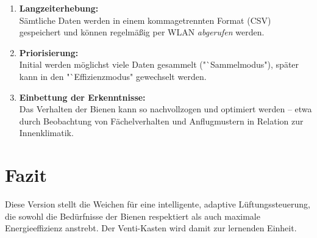 \documentclass[11pt,a4paper]{article}
\begin{document}
\begin{enumerate}[label=\arabic*.]
  \item \textbf{Langzeiterhebung:} \\S\"amtliche Daten werden in einem kommagetrennten Format (CSV) gespeichert und k\"onnen regelm\"a\ss ig per WLAN \textit{abgerufen} werden.

  \item \textbf{Priorisierung:} \\Initial werden m\"oglichst viele Daten gesammelt ("`Sammelmodus"), sp\"ater kann in den "`Effizienzmodus" gewechselt werden.

  \item \textbf{Einbettung der Erkenntnisse:} \\Das Verhalten der Bienen kann so nachvollzogen und optimiert werden -- etwa durch Beobachtung von F\"achelverhalten und Anflugmustern in Relation zur Innenklimatik.
\end{enumerate}

\section*{Fazit}
Diese Version stellt die Weichen f\"ur eine intelligente, adaptive L\"uftungssteuerung, die sowohl die Bed\"urfnisse der Bienen respektiert als auch maximale Energieeffizienz anstrebt. Der Venti-Kasten wird damit zur lernenden Einheit.
\end{document}
